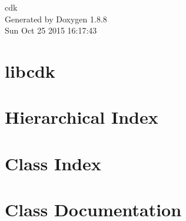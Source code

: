 \documentclass[twoside]{book}
\newcommand{\+}{\discretionary{\mbox{\scriptsize$\hookleftarrow$}}{}{}}
\newcommand{\clearemptydoublepage}{%
  \newpage{\pagestyle{empty}\cleardoublepage}%
}
\begin{document}
\begin{titlepage}
\vspace*{7cm}
\begin{center}%
{\Large cdk }\\
\vspace*{1cm}
{\large Generated by Doxygen 1.8.8}\\
\vspace*{0.5cm}
{\small Sun Oct 25 2015 16:17:43}\\
\end{center}
\end{titlepage}
\clearemptydoublepage
\tableofcontents
\clearemptydoublepage
{}

\chapter{libcdk}
\label{md_README}

\chapter{Hierarchical Index}

\chapter{Class Index}

\chapter{Class Documentation}












































\newpage
{}
{}
\printindex
\end{document}
